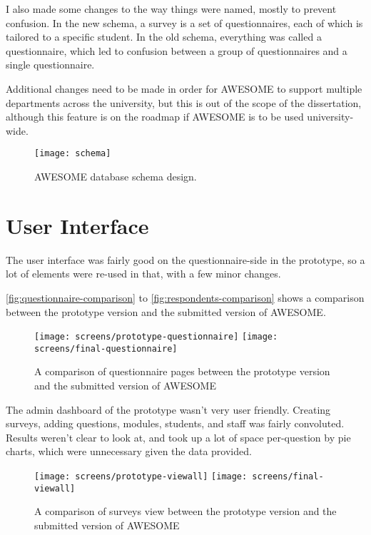	I also made some changes to the way things were named, mostly to prevent confusion.
	In the new schema, a survey is a set of questionnaires, each of which is tailored to a specific student.
	In the old schema, everything was called a questionnaire, which led to confusion between a group of questionnaires and a single questionnaire.

	Additional changes need to be made in order for \ac{AWESOME} to support multiple departments across the university, but this is out of the scope of the dissertation, although this feature is on the roadmap if \ac{AWESOME} is to be used university-wide.
	
	\begin{figure}[H]
		\texttt{[image: schema]}
		\caption{\ac{AWESOME} database schema design.}
		\label{fig:schema}
	\end{figure}
	
	\section{User Interface}
	
	The user interface was fairly good on the questionnaire-side in the prototype, so a lot of elements were re-used in that, with a few minor changes.
	
	\autoref{fig:questionnaire-comparison} to \autoref{fig:respondents-comparison} shows a comparison between the prototype version and the submitted version of \ac{AWESOME}.
	
	\begin{figure}[H]
		\texttt{[image: screens/prototype-questionnaire]}
		\texttt{[image: screens/final-questionnaire]}
		\caption{A comparison of questionnaire pages between the prototype version and the submitted version of \acs{AWESOME}}
		\label{fig:questionnaire-comparison}
	\end{figure}
	
	The admin dashboard of the prototype wasn't very user friendly.
	Creating surveys, adding questions, modules, students, and staff was fairly convoluted.
	Results weren't clear to look at, and took up a lot of space per-question by pie charts, which were unnecessary given the data provided.
	
	\begin{figure}[H]
		\texttt{[image: screens/prototype-viewall]}
		\texttt{[image: screens/final-viewall]}
		\caption{A comparison of surveys view between the prototype version and the submitted version of \acs{AWESOME}}
		\label{fig:surveys-comparison}
	\end{figure}
	

